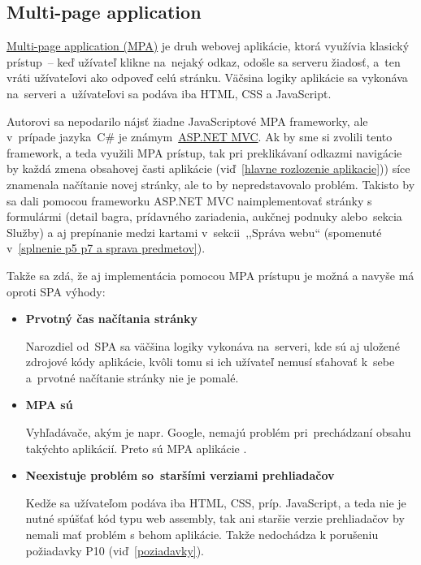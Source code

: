 \subsection{Multi-page application}
\label{multi page application}

\href{https://www.linkedin.com/pulse/single-page-application-vs-multi-page-what-better-your-/}{Multi-page application (MPA)} je druh webovej aplikácie, ktorá využívia klasický prístup~-- keď užívateľ klikne na~nejaký odkaz, odošle sa serveru žiadosť, a~ten vráti užívateľovi ako odpoveď celú stránku. Väčsina logiky aplikácie sa vykonáva na~serveri a~užívateľovi sa podáva iba HTML, CSS a JavaScript.

Autorovi sa nepodarilo nájsť žiadne JavaScriptové MPA frameworky, ale v~prípade jazyka~C\# je známym~\href{https://dotnet.microsoft.com/en-us/apps/aspnet/mvc}{ASP.NET MVC}. Ak by sme si zvolili tento framework, a teda využili MPA prístup, tak pri preklikávaní odkazmi navigácie by každá zmena obsahovej časti aplikácie (viď~\ref{hlavne rozlozenie aplikacie})) síce znamenala načítanie novej stránky, ale to by nepredstavovalo problém. Takisto by sa dali pomocou frameworku ASP.NET MVC naimplementovať stránky s formulármi (detail bagra, prídavného zariadenia, aukčnej podnuky alebo~sekcia Služby) a aj prepínanie medzi kartami v~sekcii~,,Správa webu`` (spomenuté v~\ref{splnenie p5 p7 a sprava predmetov}).

Takže sa zdá, že aj implementácia pomocou MPA prístupu je možná a navyše má oproti SPA výhody:

\begin{itemize}
\item \textbf{Prvotný čas načítania stránky}

Narozdiel od~SPA sa väčšina logiky vykonáva na~serveri, kde sú aj uložené zdrojové kódy aplikácie, kvôli tomu si ich užívateľ nemusí sťahovať k~sebe a~prvotné načítanie stránky nie je pomalé.

\item \textbf{MPA sú }

Vyhľadávače, akým je napr. Google, nemajú problém pri~prechádzaní obsahu takýchto aplikácií. Preto sú MPA aplikácie .

\item \textbf{Neexistuje problém so~staršími verziami prehliadačov}

Kedže sa užívateľom podáva iba HTML, CSS, príp. JavaScript, a teda nie je nutné spúšťať kód typu web assembly, tak ani staršie verzie prehliadačov by nemali mať problém s behom aplikácie. Takže nedochádza k porušeniu požiadavky P10 (viď~\ref{poziadavky}).
\end{itemize}


